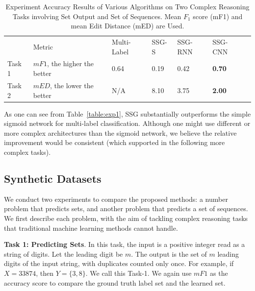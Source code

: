 \documentclass[letterpaper]{article} %
\begin{document}
\begin{table}[!htbp]
\centering
\caption{Experiment Accuracy Results of Various Algorithms on Two Complex Reasoning Tasks involving Set Output and Set of Sequences. \newline Mean $F_1$ score (mF1) and mean Edit Distance (mED) are Used. }
\label{table:res}
\begin{tabular}{|l||l||l| l|l|l|l}
\cline{1-6}
  \rule{0pt}{4ex}       &Metric & Multi-Label & SSG-S & SSG-RNN & SSG-CNN &  \\ \cline{1-6}
\rule{0pt}{2ex}    Task 1 & $mF1$, the higher the better & 0.64 &  0.19   &    0.42     &    {\bf  0.70}   &  \\ 
 \cline{1-6}
\rule{0pt}{2ex}    Task 2 & $mED$, the lower the better & N/A & 8.10     &  3.75      &   {\bf  2.00}     &  \\ \cline{1-6}
\end{tabular}
\end{table}


As one can see from Table~\ref{table:exp1}, SSG  substantially outperforms the simple sigmoid network for multi-label classification. Although one might use different or more complex architectures than the sigmoid network, we believe the relative improvement would be consistent (which supported in the following more complex tasks). 

\subsection{Synthetic Datasets}
We conduct two experiments to compare the proposed methods: a number problem that predicts sets, and another problem that predicts a set of sequences. We first describe each problem, with the aim of tackling complex reasoning tasks that traditional machine learning methods cannot handle.  

\noindent\textbf{Task 1: Predicting Sets}. 
In this task, the input is a positive integer read as a string of digits. Let the leading digit be $m$. The output is the set of $m$ leading digits of the input string, with duplicates counted only once. For example, if $X=33874$, then $Y=\{3,8\}$. We call this Task-1. We again use $mF1$ as the accuracy score to compare the ground truth label set and the learned set. 
\end{document}
